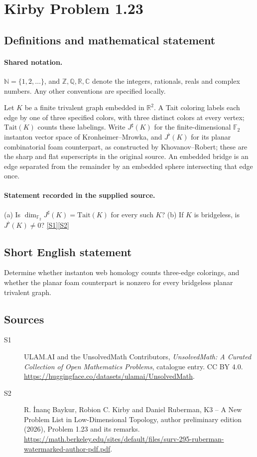 \documentclass[11pt]{article}
\newcommand{\sref}[2]{\hyperlink{source:#1:#2}{[S#2]}}
\begin{document}
\section{Kirby Problem 1.23}\label{statement}

\subsection{Definitions and mathematical statement}

\paragraph{Shared notation.}$\mathbb N=\{1,2,\ldots\}$, and $\mathbb Z,\mathbb Q,\mathbb R,\mathbb C$ denote the integers, rationals, reals and complex numbers. Any other conventions are specified locally.


Let $K$ be a finite trivalent graph embedded in $\mathbb R^2$. A Tait coloring labels each edge by one of three specified colors, with three distinct colors at every vertex; $\mathrm{Tait}(K)$ counts these labelings. Write $J^{\sharp}(K)$ for the finite-dimensional $\mathbb F_2$ instanton vector space of Kronheimer--Mrowka, and $J^{\flat}(K)$ for its planar combinatorial foam counterpart, as constructed by Khovanov--Robert; these are the sharp and flat superscripts in the original source. An embedded bridge is an edge separated from the remainder by an embedded sphere intersecting that edge once.
\paragraph{Statement recorded in the supplied source.}
(a) Is $\dim_{\mathbb F_2}J^{\sharp}(K)=\mathrm{Tait}(K)$ for every such $K$? (b) If $K$ is bridgeless, is $J^{\flat}(K)\ne0$? \sref{statement}{1}\sref{statement}{2}
\subsection{Short English statement}
Determine whether instanton web homology counts three-edge colorings, and whether the planar foam counterpart is nonzero for every bridgeless planar trivalent graph.
\subsection{Sources}
\begin{description}
\item[\hypertarget{source:statement:1}{S1}] ULAM.AI and the UnsolvedMath Contributors, \emph{UnsolvedMath: A Curated Collection of Open Mathematics Problems}, catalogue entry. CC BY 4.0. \url{https://huggingface.co/datasets/ulamai/UnsolvedMath}.
\item[\hypertarget{source:statement:2}{S2}] R. \.{I}nan\c{c} Baykur, Robion C. Kirby and Daniel Ruberman, K3 -- A New Problem List in Low-Dimensional Topology, author preliminary edition (2026), Problem 1.23 and its remarks. \url{https://math.berkeley.edu/sites/default/files/surv-295-ruberman-watermarked-author-pdf.pdf}.
\end{description}
\label{end:statement}
\end{document}
